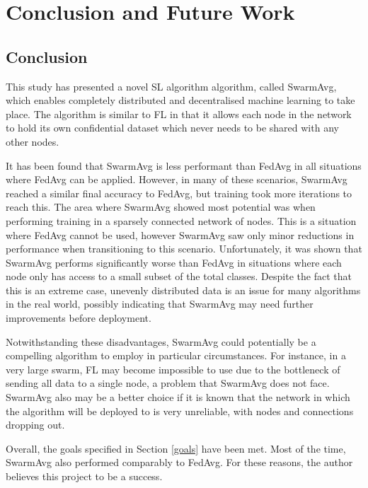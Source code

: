 \chapter{Conclusion and Future Work}
\section{Conclusion}
This study has presented a novel SL algorithm algorithm, called SwarmAvg, which enables completely distributed and decentralised machine learning to take place. The algorithm is similar to FL in that it allows each node in the network to hold its own confidential dataset which never needs to be shared with any other nodes.

It has been found that SwarmAvg is less performant than FedAvg in all situations where FedAvg can be applied. However, in many of these scenarios, SwarmAvg reached a similar final accuracy to FedAvg, but training took more iterations to reach this. The area where SwarmAvg showed most potential was when performing training in a sparsely connected network of nodes. This is a situation where FedAvg cannot be used, however SwarmAvg saw only minor reductions in performance when transitioning to this scenario. Unfortunately, it was shown that SwarmAvg performs significantly worse than FedAvg in situations where each node only has access to a small subset of the total classes. Despite the fact that this is an extreme case, unevenly distributed data is an issue for many algorithms in the real world, possibly indicating that SwarmAvg may need further improvements before deployment.

Notwithstanding these disadvantages, SwarmAvg could potentially be a compelling algorithm to employ in particular circumstances. For instance, in a very large swarm, FL may become impossible to use due to the bottleneck of sending all data to a single node, a problem that SwarmAvg does not face. SwarmAvg also may be a better choice if it is known that the network in which the algorithm will be deployed to is very unreliable, with nodes and connections dropping out.

Overall, the goals specified in Section \ref{goals} have been met. Most of the time, SwarmAvg also performed comparably to FedAvg. For these reasons, the author believes this project to be a success.

